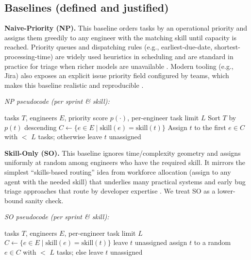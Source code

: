\documentclass[journal]{IEEEtran}
\begin{document}
\subsection{Baselines (defined and justified)}
\label{sec:baselines}

\textbf{Naive-Priority (NP).} This baseline orders tasks by an operational priority and assigns them greedily to any engineer with the matching skill until capacity is reached. Priority queues and dispatching rules (e.g., earliest-due-date, shortest-processing-time) are widely used heuristics in scheduling and are standard in practice for triage when richer models are unavailable \cite{karger_sched_notes}. Modern tooling (e.g., Jira) also exposes an explicit issue priority field configured by teams, which makes this baseline realistic and reproducible \cite{atlassian_priorities}.
\vspace{2pt}

\noindent\emph{NP pseudocode (per sprint \& skill):}
\begin{algorithm}[H]
\caption{Naive-Priority baseline}
\label{alg:np}
\begin{algorithmic}[1]
\Require tasks $T$, engineers $E$, priority score $p(\cdot)$, per-engineer task limit $L$
\State Sort $T$ by $p(t)$ descending
  \State $C \gets \{e \in E \mid \text{skill}(e)=\text{skill}(t)\}$
  \State Assign $t$ to the first $e \in C$ with $<$ $L$ tasks; otherwise leave $t$ unassigned
\EndFor
\end{algorithmic}
\end{algorithm}

\noindent\textbf{Skill-Only (SO).} This baseline ignores time/complexity geometry and assigns uniformly at random among engineers who have the required skill. It mirrors the simplest “skills-based routing” idea from workforce allocation (assign to any agent with the needed skill) that underlies many practical systems and early bug triage approaches that route by developer expertise \cite{xuan2017bugtriage,guo2011notmybug}. We treat SO as a lower-bound sanity check.
\vspace{2pt}

\noindent\emph{SO pseudocode (per sprint \& skill):}
\begin{algorithm}[H]
\caption{Skill-Only baseline}
\label{alg:so}
\begin{algorithmic}[1]
\Require tasks $T$, engineers $E$, per-engineer task limit $L$
  \State $C \gets \{e \in E \mid \text{skill}(e)=\text{skill}(t)\}$
   leave $t$ unassigned
  \Else assign $t$ to a random $e \in C$ with $<$ $L$ tasks; else leave $t$ unassigned
  \EndIf
\EndFor
\end{algorithmic}
\end{algorithm}
\end{document}
